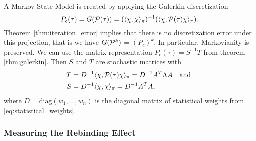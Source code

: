 A Markov State Model is created by applying the Galerkin discretization
\begin{equation}
P_c(\tau) = G(\mathcal{P}(\tau)) = (\langle \chi, \chi \rangle_\pi)^{-1} (\langle \chi, \mathcal{P}(\tau) \chi \rangle_\pi).
\end{equation}
Theorem \ref{thm:iteration_error} implies that there is no discretization error under this projection, that is we have $G(\mathcal{P}^k)$ = $(P_c)^k$. In particular, Markovianity is preserved.
We can use the matrix representation $P_c(\tau)=S^{-1}T$ from theorem \ref{thm:galerkin}. Then $S$ and $T$ are stochastic matrices with 
\begin{equation}
\label{eq:projection_presentation}
\begin{aligned}
T & = D^{-1} \langle \chi, \mathcal{P}(\tau) \chi \rangle_\pi = D^{-1}A^T \Lambda A \ \ \textrm{ and } \\
S & = D^{-1} \langle \chi, \chi \rangle_\pi = D^{-1} A^T A,
\end{aligned}
\end{equation}
where $D= \mathrm{diag}(w_1,\dots,w_n)$ is the diagonal matrix of statistical weights from \eqref{eq:statistical_weights}.

\subsubsection*{Measuring the Rebinding Effect}


